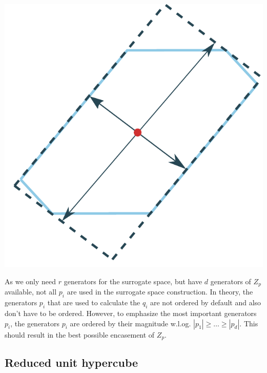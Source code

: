 \documentclass[
  a4paper,  %
  twoside,  %
  bibliography=totoc,
  headsepline,
  cleardoublepage=empty,
  parskip=half,
  draft=false
]{scrbook}
\begin{document}
\begin{mdframed}[style=style]
        \centering
\begin{minipage}{.49\textwidth}
        \centering
  \label{fig:surrogate_space}
    \end{minipage}%
    \begin{minipage}{0.49\textwidth}
        \centering
        \vspace{3.5mm}
  \includegraphics[width=0.8\linewidth]{graphics/surrogate_space}
  \hspace{-5.5mm}
    \end{minipage}
\end{mdframed}

As we only need $r$ generators for the surrogate space, but have $d$ generators of $Z_p$ available, not all $p_i$ are used in the surrogate space construction.
In theory, the generators $p_i$ that are used to calculate the $q_i$ are not ordered by default and also don't have to be ordered.
However, to emphasize the most important generators $p_i$, the generators $p_i$ are ordered by their magnitude w.l.og. $|p_1|\geq \dots \geq |p_d|$.
This should result in the best possible encasement of $Z_p$.

\subsection{Reduced unit hypercube}
\end{document}
